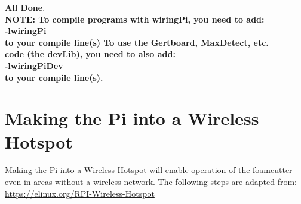 \documentclass[titlepage,12pt,letter]{report}
\numberwithin{equation}{chapter}
\begin{document}
\begin{enumerate}[noitemsep,topsep=0pt]
\textbf{All Done}. \\
	
	\textbf{NOTE: To compile programs with wiringPi, you need to add: \\
	-lwiringPi \\
	to your compile line(s) To use the Gertboard, MaxDetect, etc.\\
	code (the devLib), you need to also add:\\
	-lwiringPiDev\\
	to your compile line(s).\\}
	
\end{enumerate}

\section{Making the Pi into a Wireless Hotspot}
Making the Pi into a Wireless Hotspot will enable operation of the foamcutter even in areas without a wireless network. The following steps are adapted from: \href{https://elinux.org/RPI-Wireless-Hotspot}{https://elinux.org/RPI-Wireless-Hotspot}
\end{document}

